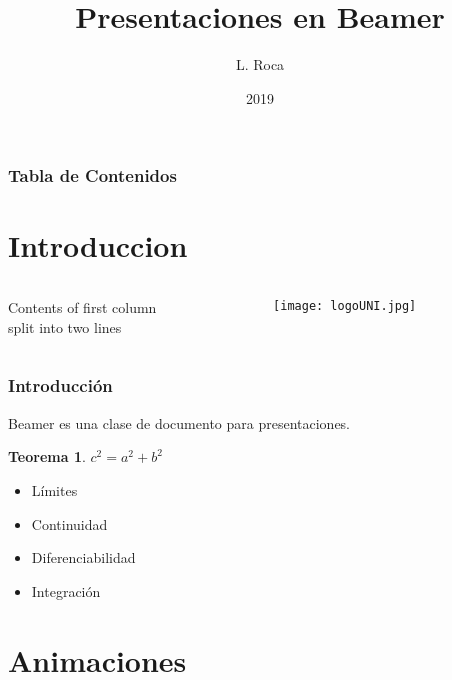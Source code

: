 \documentclass{beamer}
\title{Presentaciones en Beamer}
\author{L. Roca}
\institute[UNI]{Universidad Nacional de Ingeniería}
\date{2019}
\newtheorem{teo}{Teorema}
\begin{document}
\frame{\titlepage}

\begin{frame}
\frametitle{Tabla de Contenidos}
\tableofcontents
\end{frame}

\section{Introduccion}
\begin{frame}
\begin{columns}[T] %
     \begin{column}[T]{5cm} %
     Contents of first column \\ split into two lines
     \end{column}
     \begin{column}[T]{5cm} %
          \texttt{[image: logoUNI.jpg]}
     \end{column}
     \end{columns}
\end{frame}     
\begin{frame}
\frametitle{Introducción}
Beamer es una clase de documento para presentaciones.
\begin{teo}
$c^2=a^2+ b^2$
\end{teo}
\begin{itemize}
 \item<1-> Límites
 \item<2-> Continuidad
 \item<3> Diferenciabilidad
 \item<4-> Integración
\end{itemize}
\end{frame}
\section{Animaciones}
\end{document}
